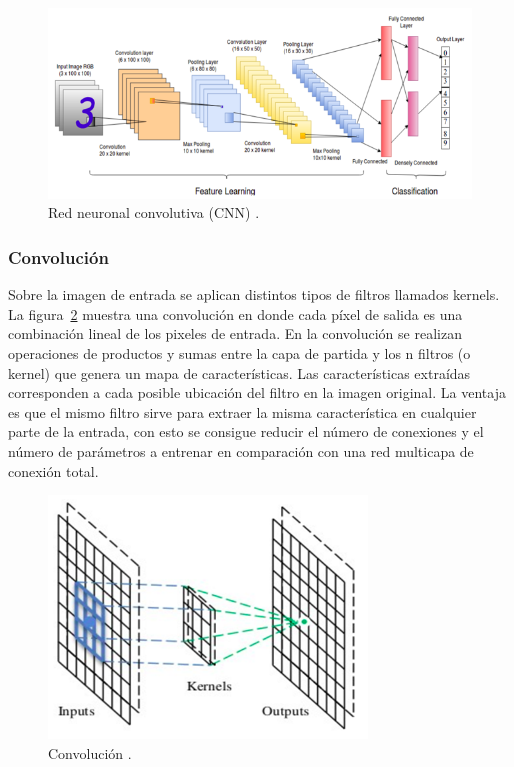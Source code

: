 \begin{figure}[th]
\centering
\includegraphics[scale = 0.9]{Figures/figura_06.PNG}
\decoRule
\caption[convolutiva]{Red neuronal convolutiva (CNN) \parencite{r7}.}
\label{fig:convolutiva}
\end{figure}

\subsubsection{Convolución}

Sobre la imagen de entrada se aplican distintos tipos de filtros llamados kernels. La figura~\ref{fig:kernel} muestra una convolución en donde cada píxel de salida es una combinación lineal de los pixeles de entrada. En la convolución se realizan operaciones de productos y sumas entre la capa de partida y los n filtros (o kernel) que genera un mapa de características. Las características extraídas corresponden a cada posible ubicación del filtro en la imagen original. La ventaja es que el mismo filtro sirve para extraer la misma característica en cualquier parte de la entrada, con esto se consigue reducir el número de conexiones y el número de parámetros a entrenar en comparación con una red multicapa de conexión total.

\begin{figure}[th]
\centering
\includegraphics{Figures/figura_07.PNG}
\decoRule
\caption[convolutiva]{Convolución \parencite{r7}.}
\label{fig:kernel}
\end{figure}

